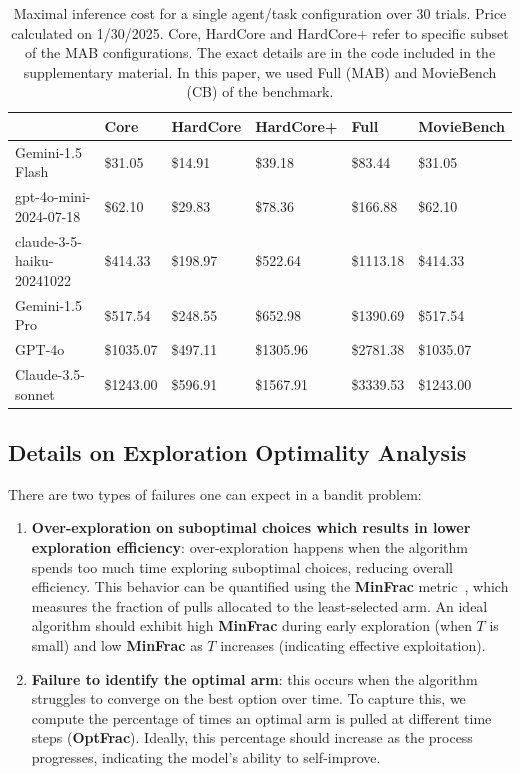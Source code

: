 \begin{table}[]
\centering
\small
\begin{tabular}{@{}llllll@{}}
\toprule
                      & Core         & HardCore     & HardCore+    & Full          & MovieBench   \\ \midrule
Gemini-1.5 Flash       & \$31.05  & \$14.91  & \$39.18  & \$83.44   & \$31.05  \\
gpt-4o-mini-2024-07-18     & \$62.10      & \$29.83      & \$78.36      & \$166.88      & \$62.10      \\
claude-3-5-haiku-20241022  & \$414.33     & \$198.97     & \$522.64     & \$1113.18     & \$414.33     \\
Gemini-1.5 Pro         & \$517.54 & \$248.55 & \$652.98 & \$1390.69 & \$517.54 \\ \midrule 
GPT-4o          & \$1035.07    & \$497.11     & \$1305.96    & \$2781.38     & \$1035.07    \\
Claude-3.5-sonnet & \$1243.00    & \$596.91     & \$1567.91    & \$3339.53     & \$1243.00    \\
 \bottomrule
\end{tabular}
\caption{Maximal inference cost for a single agent/task configuration over 30 trials. Price calculated on 1/30/2025. Core, HardCore and HardCore+ refer to specific subset of the MAB configurations. The exact details are in the code included in the supplementary material. In this paper, we used Full (MAB) and MovieBench (CB) of the benchmark.}
\end{table}

\subsection{Details on Exploration Optimality Analysis}
\label{app:sec:optimality}

There are two types of failures one can expect in a bandit problem: 
\begin{enumerate}
    \item \textbf{Over-exploration on suboptimal choices which results in lower exploration efficiency}: over-exploration happens when the algorithm spends too much time exploring suboptimal choices, reducing overall efficiency. This behavior can be quantified using the \textbf{MinFrac} metric~\citep{krishnamurthy2024can}, which measures the fraction of pulls allocated to the least-selected arm. An ideal algorithm should exhibit high \textbf{MinFrac} during early exploration (when $T$ is small) and low \textbf{MinFrac} as $T$ increases (indicating effective exploitation).
    \item \textbf{Failure to identify the optimal arm}: this occurs when the algorithm struggles to converge on the best option over time. To capture this, we compute the percentage of times an optimal arm is pulled at different time steps (\textbf{OptFrac}). Ideally, this percentage should increase as the process progresses, indicating the model's ability to self-improve.
\end{enumerate}

